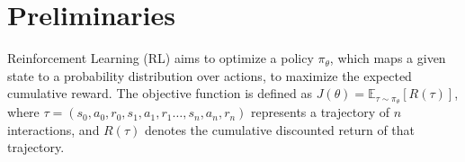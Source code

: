 









\section{Preliminaries}
\label{subsec:preliminaries}

Reinforcement Learning (RL) aims to optimize a policy $\pi_{\theta}$, which maps a given state to a probability distribution over actions, to maximize the expected cumulative reward. The objective function is defined as $J(\theta) = \mathbb{E}_{\tau \sim \pi_{\theta}}[R(\tau)]$, where $\tau = (s_0, a_0, r_0, s_1,a_1,r_1\dots, s_n, a_n,r_n)$ represents a trajectory of $n$ interactions, and $R(\tau)$ denotes the cumulative discounted return of that trajectory. 

